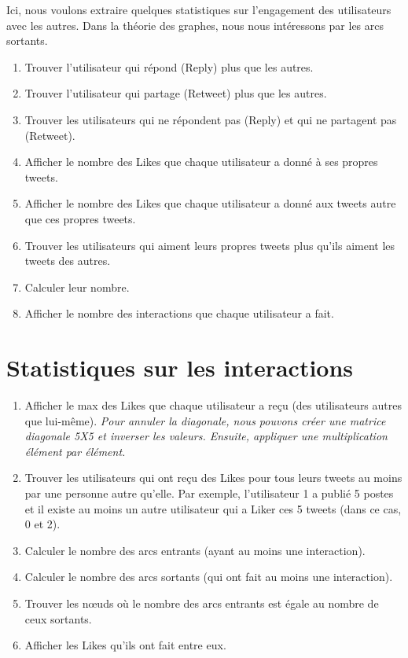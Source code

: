 \documentclass[11pt, a4paper]{article}
\begin{document}
Ici, nous voulons extraire quelques statistiques sur l'engagement des utilisateurs avec les autres.
Dans la théorie des graphes, nous nous intéressons par les arcs sortants.

\begin{enumerate}
	\item Trouver l'utilisateur qui répond (Reply) plus que les autres.
	\item Trouver l'utilisateur qui partage (Retweet) plus que les autres.
	\item Trouver les utilisateurs qui ne répondent pas (Reply) et qui ne partagent pas (Retweet).
	\item Afficher le nombre des Likes que chaque utilisateur a donné à ses propres tweets.
	\item Afficher le nombre des Likes que chaque utilisateur a donné aux tweets autre que ces propres tweets.
	\item Trouver les utilisateurs qui aiment leurs propres tweets plus qu'ils aiment les tweets des autres.
	\item Calculer leur nombre.
	\item Afficher le nombre des interactions que chaque utilisateur a fait.
\end{enumerate}

\section*{Statistiques sur les interactions}

\begin{enumerate}
	\item Afficher le max des Likes que chaque utilisateur a reçu (des utilisateurs autres que lui-même).
	\textit{Pour annuler la diagonale, nous pouvons créer une matrice diagonale 5X5 et inverser les valeurs.
		Ensuite, appliquer une multiplication élément par élément.}
	\item Trouver les utilisateurs qui ont reçu des Likes pour tous leurs tweets au moins par une personne autre qu'elle.
	Par exemple, l'utilisateur 1 a publié 5 postes et il existe au moins un autre utilisateur qui a Liker ces 5 tweets (dans ce cas, 0 et 2).
	\item Calculer le nombre des arcs entrants (ayant au moins une interaction).
	\item Calculer le nombre des arcs sortants (qui ont fait au moins une interaction).
	\item Trouver les nœuds où le nombre des arcs entrants est égale au nombre de ceux sortants.
	\item Afficher les Likes qu'ils ont fait entre eux.
\end{enumerate}
\end{document}
